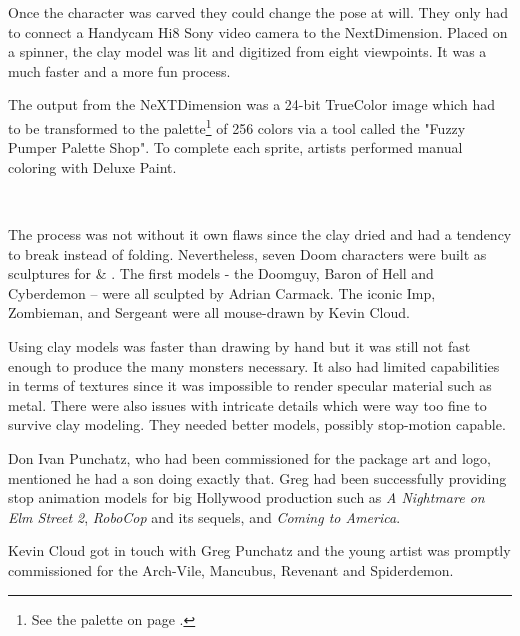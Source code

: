 \vspace{-4mm}
Once the character was carved they could change the pose at will. They only had to connect a Handycam Hi8 Sony video camera to the NextDimension. Placed on a spinner, the clay model was lit and digitized from eight viewpoints. It was a much faster and a more fun process.\\
\par
The output from the NeXTDimension was a 24-bit TrueColor image which had to be transformed to the \doom{} palette\footnote{See the \doom{} palette on page \pageref{doom_palette}.} of 256 colors via a tool called the "Fuzzy Pumper Palette Shop". To complete each sprite, artists performed manual coloring with Deluxe Paint.\\
\par
{}\\
\par
The process was not without it own flaws since the clay dried and had a tendency to break instead of folding. Nevertheless, seven Doom characters were built as sculptures for \doom{} \& \doomii{}. The first models - the Doomguy, Baron of Hell and Cyberdemon -- were all sculpted by Adrian Carmack. The iconic Imp, Zombieman, and Sergeant were all mouse-drawn by Kevin Cloud.\\
\par
{}

\par
{}




\vspace{-4mm}
Using clay models was faster than drawing by hand but it was still not fast enough to produce the many monsters necessary. It also had limited capabilities in terms of textures since it was impossible to render specular material such as metal. There were also issues with intricate details which were way too fine to survive clay modeling. They needed better models, possibly stop-motion capable.\\
\par
Don Ivan Punchatz, who had been commissioned for the \doom{} package art and logo, mentioned he had a son doing exactly that. Greg had been successfully providing stop animation models for big Hollywood production such as \textit{A Nightmare on Elm Street 2}, \textit{RoboCop} and its sequels, and \textit{Coming to America}. \\
\par
Kevin Cloud got in touch with Greg Punchatz and the young artist was promptly commissioned for the Arch-Vile, Mancubus, Revenant and Spiderdemon.\\
\par

